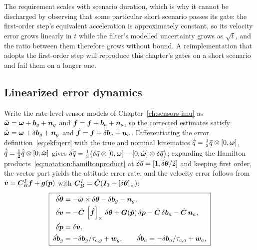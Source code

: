 The requirement scales with scenario duration, which is why it cannot
be discharged by observing that some particular short scenario passes
its gate: the first-order step's equivalent acceleration is
approximately constant, so its velocity error grows linearly in $t$
while the filter's modelled uncertainty grows as $\sqrt{t}$, and the
ratio between them therefore grows without bound. A reimplementation
that adopts the first-order step will reproduce this chapter's gates on
a short scenario and fail them on a longer one.

\subsection{Linearized error dynamics}
\label{sec:ekf:errordynamics}

Write the rate-level sensor models of Chapter~\ref{ch:sensors-imu} as
$\tilde{\bm{\omega}} = \bm{\omega} + \bm{b}_g + \bm{n}_g$ and
$\tilde{\bm{f}} = \bm{f} + \bm{b}_a + \bm{n}_a$, so the corrected
estimates satisfy $\hat{\bm{\omega}} = \bm{\omega} + \delta\bm{b}_g +
\bm{n}_g$ and $\hat{\bm{f}} = \bm{f} + \delta\bm{b}_a + \bm{n}_a$.
Differentiating the error definition~\eqref{eq:ekf:qerr} with the true
and nominal kinematics $\dot{\bar{q}} = \tfrac12 \bar{q} \otimes
[0, \bm{\omega}]$, $\dot{\hat{\bar{q}}} = \tfrac12 \hat{\bar{q}}
\otimes [0, \hat{\bm{\omega}}]$ gives $\dot{\delta\bar{q}} =
\tfrac12\bigl(\delta\bar{q} \otimes [0, \bm{\omega}] -
[0, \hat{\bm{\omega}}] \otimes \delta\bar{q}\bigr)$; expanding the
Hamilton products~\eqref{eq:notation:hamiltonproduct} at
$\delta\bar{q} = [1, \delta\bm{\theta}/2]$ and keeping first order,
the vector part yields the attitude error rate, and the velocity error
follows from $\dot{\bm{v}} = \bm{C}_{B}^{I}\bm{f} + \bm{g}(\bm{p})$ with
$\bm{C}_{B}^{I} = \hat{\bm{C}}(\bm{I}_3 + \left[\delta\bm{\theta}\right]_{\times})$:
\begin{equation}
  \boxed{\;
  \begin{aligned}
    \dot{\delta\bm{\theta}} &= -\hat{\bm{\omega}} \times
      \delta\bm{\theta} - \delta\bm{b}_g - \bm{n}_g,\\
    \dot{\delta\bm{v}} &= -\hat{\bm{C}}\,\left[\hat{\bm{f}}\right]_{\times}\,
      \delta\bm{\theta} + \bm{G}(\hat{\bm{p}})\,\delta\bm{p}
      - \hat{\bm{C}}\,\delta\bm{b}_a - \hat{\bm{C}}\,\bm{n}_a,\\
    \dot{\delta\bm{p}} &= \delta\bm{v},\\
    \dot{\delta\bm{b}}_g &= -\delta\bm{b}_g/\tau_{c,g} + \bm{w}_g,
    \qquad
    \dot{\delta\bm{b}}_a = -\delta\bm{b}_a/\tau_{c,a} + \bm{w}_a,
  \end{aligned}
  \;}
  \label{eq:ekf:errdyn}
\end{equation}

